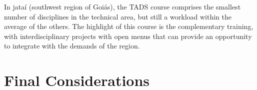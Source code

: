 \documentclass[sigconf, review]{educomp}
\begin{document}
In jataí (southwest region of Goiás), the TADS course comprises the smallest number of disciplines in the technical area, but still a workload within the average of the others.
The highlight of this course is the complementary training, with interdisciplinary projects with open menus that can provide an opportunity to integrate with the demands of the region.



\section{Final Considerations}\label{FinalConsiderations}



\end{document}
